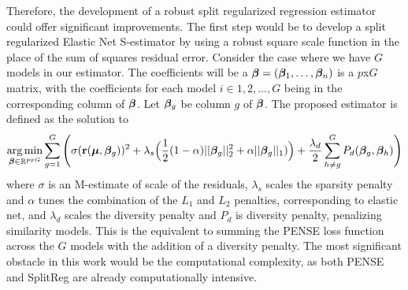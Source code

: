Therefore, the development of a robust split regularized regression estimator could offer significant improvements. The first step would be to develop a split regularized Elastic Net S-estimator by using a robust square scale function in the place of the sum of squares residual error. Consider the case where we have $G$ models in our estimator. The coefficients will be a $\bm{\beta} = (\bm{\beta}_1,\hdots,\bm{\beta}_n)$ is a $p$x$G$ matrix, with the coefficients for each model $i \in {1,2,\hdots,G}$ being in the corresponding column of $\bm{\beta}$. Let $\bm{\beta}_g$ be column $g$ of $\bm{\beta}$. The proposed estimator is defined as the solution to
\begin{equation}
    \operatorname*{arg\,min}_{\bm{\beta} \in \mathbb{R}^{pxG}} \sum_{g=1}^G \Bigg(\sigma(\mathbf{r}(\boldsymbol{\mu}, \bm{\beta}_g))^2 + \lambda_s \Big( \frac{1}{2}(1 - \alpha)||\bm{\beta}_g||^2_2 + \alpha ||\bm{\beta}_g||_1)\Big) + \frac{\lambda_d}{2} \sum_{h \not=g}^G P_d(\bm{\beta}_g, \bm{\beta}_h) \Bigg)
\end{equation}
where $\sigma$ is an M-estimate of scale of the residuals, $\lambda_s$ scales the sparsity penalty and $\alpha$ tunes the combination of the $L_1$ and $L_2$ penalties, corresponding to elastic net, and $\lambda_d$ scales the diversity penalty and $P_d$ is diversity penalty, penalizing similarity models. This is the equivalent to summing the PENSE loss function \cite{freue2017pense} across the $G$ models with the addition of a diversity penalty. The most significant obstacle in this work would be the computational complexity, as both PENSE and SplitReg are already computationally intensive.


